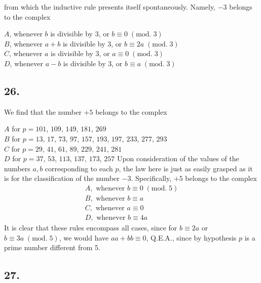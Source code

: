 \documentclass[twoside,12pt]{memoir}
\renewenvironment{quote}%
  {\list{}{\leftmargin=5em\rightmargin=0em}\item[]}%
  {\endlist}
\renewcommand{\pmod}[1]{\;(\textrm{mod.}\;#1)}
\begin{document}
from which the inductive rule presents itself spontaneously. Namely, \(-3\) belongs to the complex
\begin{quote}
\(A\), whenever \(b\) is divisible by 3, or \(b \equiv 0\pmod{3}\)\\
\(B\), whenever \(a+b\) is divisible by 3, or \(b \equiv 2 a\pmod{3}\)\\
\(C\), whenever \(a\) is divisible by 3, or \(a \equiv 0\pmod{3}\)\\
\(D\), whenever \(a-b\) is divisible by 3, or \(b \equiv a\pmod{3}\)
\end{quote}
%

\subsection*{26.}

We find that the number \(+5\) belongs to the complex
\begin{quote}
\(A\) for \(p=101\), \(109\), \(149\), \(181\), \(269\) \\
\(B\) for \(p=13\), \(17\), \(73\), \(97\), \(157\), \(193\), \(197\), \(233\), \(277\), \(293\) \\
\(C\) for \(p=29\), \(41\), \(61\), \(89\), \(229\), \(241\), \(281\) \\
\(D\) for \(p=37\), \(53\), \(113\), \(137\), \(173\), \(257\)\end{quote}
Upon consideration of the values of the numbers \(a, b\) corresponding to each \(p\), the law here is just as easily grasped as it is for the classification of the number \(-3\). Specifically, \(+5\) belongs to the complex
\[\begin{array}{l}
A, \text{ whenever } b \equiv 0\pmod{5} \\
B, \text{ whenever } b \equiv a \\
C, \text{ whenever } a \equiv 0 \\
D, \text{ whenever } b \equiv 4 a
\end{array}\]
It is clear that these rules encompass all cases, since for \(b \equiv 2 a\) or \(b \equiv 3 a\pmod{5}\), we would have \(a a+b b \equiv 0\), Q.E.A., since by hypothesis \(p\) is a prime number different from 5.
%

\subsection*{27.}
\end{document}
